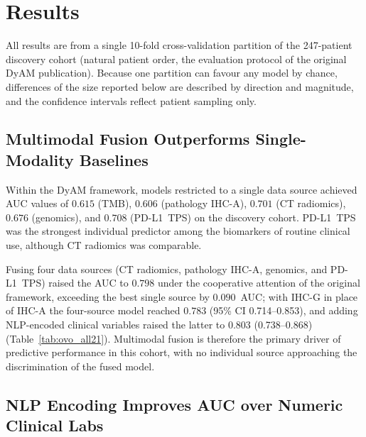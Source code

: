 \section{Results}
\label{sec:results}

All results are from a single 10-fold cross-validation partition of the 247-patient discovery cohort
(natural patient order, the evaluation protocol of the original DyAM publication). Because one partition
can favour any model by chance, differences of the size reported below are described by direction and
magnitude, and the confidence intervals reflect patient sampling only.

\subsection{Multimodal Fusion Outperforms Single-Modality Baselines}
\label{sec:baselines}

Within the DyAM framework, models restricted to a single data source achieved AUC values of
$0.615$ (TMB), $0.606$ (pathology IHC-A), $0.701$ (CT radiomics), $0.676$ (genomics), and
$0.708$ (PD-L1~TPS) on the discovery cohort.
PD-L1~TPS was the strongest individual predictor among the biomarkers of routine clinical use,
although CT radiomics was comparable.

Fusing four data sources (CT radiomics, pathology IHC-A, genomics, and PD-L1~TPS) raised the AUC to
$0.798$ under the cooperative attention of the original framework, exceeding the best single source by
$0.090$~AUC; with IHC-G in place of IHC-A the four-source model reached $0.783$ (95\% CI 0.714--0.853),
and adding NLP-encoded clinical variables raised the latter to $0.803$ (0.738--0.868) (Table~\ref{tab:ovo_all21}).
Multimodal fusion is therefore the primary driver of predictive performance in this cohort, with no
individual source approaching the discrimination of the fused model.


\subsection{NLP Encoding Improves AUC over Numeric Clinical Labs}
\label{sec:nlp_auc}


